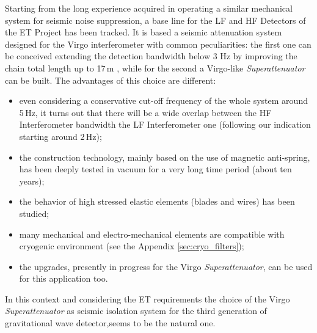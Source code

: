 Starting from the long experience acquired in operating a similar mechanical system for seismic noise suppression, a base line for the LF and HF Detectors of the ET Project has been tracked. It is based a seismic attenuation system designed for the Virgo interferometer with common peculiarities: the first one can be conceived extending the detection bandwidth below 3 Hz by improving the chain total length up to 17\,m , while for the second a Virgo-like \emph{Superattenuator} can be built. The advantages of this choice are different:  
\begin{itemize}
\item even considering a conservative cut-off frequency of the whole system around 5\,Hz, it turns out that there will be a wide overlap between the HF Interferometer bandwidth the LF Interferometer one (following our indication starting around 2\,Hz);
\item the construction technology, mainly based on the use of magnetic anti-spring, has been deeply tested in vacuum for a very long time period (about ten years);
\item the behavior of high stressed elastic elements (blades and wires) has been 
studied;
\item many mechanical and electro-mechanical elements are compatible with cryogenic environment (see the Appendix \ref{sec:cryo_filters});
\item the upgrades, presently in progress for the Virgo \emph{Superattenuator}, 
can be used for this application too.
\end{itemize}

In this context and considering the ET requirements the choice of the Virgo \emph{Superattenuator} as seismic isolation system for the third generation of gravitational wave detector,seems to be the natural one.

\FloatBarrier 

